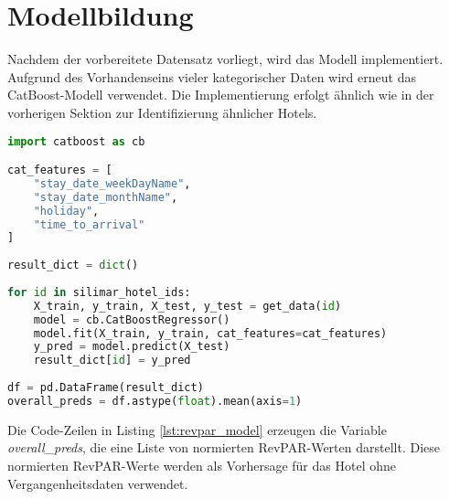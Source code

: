\section{Modellbildung}
\label{subsec:revpar_model}

Nachdem der vorbereitete Datensatz vorliegt, wird das Modell implementiert. Aufgrund des Vorhandenseins vieler kategorischer Daten wird erneut das CatBoost-Modell verwendet. Die Implementierung erfolgt ähnlich wie in der vorherigen Sektion zur Identifizierung ähnlicher Hotels.

\begin{lstlisting}[language=Python, label=lst:revpar_model, caption=Erzeugung der RevPAR-Vorhersagen]
import catboost as cb

cat_features = [
    "stay_date_weekDayName",
    "stay_date_monthName",
    "holiday",
    "time_to_arrival"
]
    
result_dict = dict()
    
for id in silimar_hotel_ids:
    X_train, y_train, X_test, y_test = get_data(id)
    model = cb.CatBoostRegressor()
    model.fit(X_train, y_train, cat_features=cat_features)
    y_pred = model.predict(X_test)
    result_dict[id] = y_pred
    
df = pd.DataFrame(result_dict)
overall_preds = df.astype(float).mean(axis=1)
\end{lstlisting}

Die Code-Zeilen in Listing \ref{lst:revpar_model} erzeugen die Variable \emph{overall\_preds}, die eine Liste von normierten RevPAR-Werten darstellt. Diese normierten RevPAR-Werte werden als Vorhersage für das Hotel ohne Vergangenheitsdaten verwendet.
    